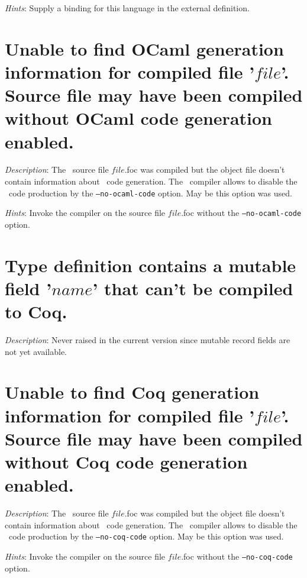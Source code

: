 {\em Hints}: Supply a binding for this language in the external
definition.



\section*{Unable to find OCaml generation information for compiled
  file '$file$'. Source file may have been compiled without OCaml code
  generation enabled.}

{\em Description}: The \focal\ source file $file$.foc was compiled but
the object file doesn't contain information about \ocaml\ code
generation. The \focal\ compiler allows to disable the \ocaml\ code
production by the {\tt --no-ocaml-code} option. May be this option was used.

{\em Hints}: Invoke the compiler on the source file $file$.foc without
the {\tt --no-ocaml-code} option.



\section*{Type definition contains a mutable field '$name$' that can't
  be compiled to Coq.}

{\em Description}: {\color{red} Never raised in the current version
  since mutable record fields are not yet available}.



\section*{Unable to find Coq generation information for compiled file
  '$file$'. Source file may have been compiled without Coq code
  generation enabled.}

{\em Description}: The \focal\ source file $file$.foc was compiled but
the object file doesn't contain information about \coq\ code
generation. The \focal\ compiler allows to disable the \coq\ code
production by the {\tt --no-coq-code} option. May be this option was used.

{\em Hints}: Invoke the compiler on the source file $file$.foc without
the {\tt --no-coq-code} option.



